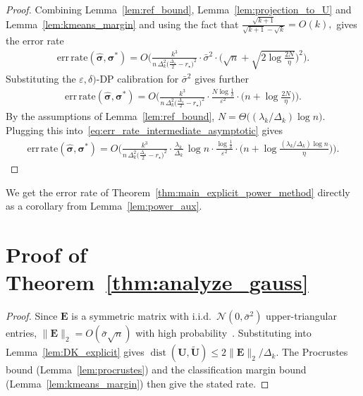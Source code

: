 \documentclass[11pt]{article}
\theoremstyle{plain}
\theoremstyle{definition}
\theoremstyle{remark}
\begin{document}
\begin{proof}

Combining Lemma~\ref{lem:ref_bound},
Lemma~\ref{lem:projection_to_U} and Lemma~\ref{lem:kmeans_margin} and using the fact that 
$
\frac{\sqrt{k+1}}{\sqrt{k+1} - \sqrt{k}} = O(k),
$
gives the error rate
\begin{equation*}
\begin{aligned}
\mathrm{err\,rate}(\hat{\bm{\sigma}},\bm{\sigma}^\ast)
=  O \Bigg(
\frac{k^3}{n\,\Delta_k^2\bigl(\tfrac{\Delta_\star}{2}-r_\star\bigr)^2}
\cdot
\bar\sigma^2
\cdot
\Big(\sqrt{n}+\sqrt{2\log\frac{2N}{\eta}}\Big)^2
\Bigg).
\end{aligned}
\end{equation*}
Substituting the $\varepsilon,\delta)$-DP calibration for $\bar\sigma^2$ gives further
\begin{equation} \label{eq:err_rate_intermediate_asymptotic}
\begin{aligned}
\mathrm{err\,rate}(\hat{\bm{\sigma}},\bm{\sigma}^\ast)
=  O \Bigg(
\frac{k^3}{n\,\Delta_k^2\bigl(\tfrac{\Delta_\star}{2}-r_\star\bigr)^2}
\cdot
\frac{N\log\frac{1}{\delta}}{\varepsilon^2}
\cdot
\Big(n+\log\frac{2N}{\eta}\Big)
\Bigg).
\end{aligned}
\end{equation}
By the assumptions of Lemma~\ref{lem:ref_bound}, $N = \Theta\big((\lambda_k/\Delta_k)\log n\big)$. Plugging this into~\eqref{eq:err_rate_intermediate_asymptotic} gives
\begin{equation*}
\begin{aligned}
\mathrm{err\,rate}(\hat{\bm{\sigma}},\bm{\sigma}^\ast)
=  O \Bigg(
\frac{k^3}{n\,\Delta_k^2\bigl(\tfrac{\Delta_\star}{2}-r_\star\bigr)^2}
\cdot
\frac{\lambda_k}{\Delta_k}\,\log n
\cdot
\frac{\log\frac{1}{\delta}}{\varepsilon^2}
\cdot
\Big(n+\log\frac{(\lambda_k/\Delta_k)\log n}{\eta}\Big)
\Bigg).
\end{aligned}
\end{equation*}
\end{proof}


We get the error rate of Theorem~\ref{thm:main_explicit_power_method} directly as a corollary from Lemma~\ref{lem:power_aux}.



\section{Proof of Theorem~\ref{thm:analyze_gauss}}


\begin{proof}
Since $\mathbf{E}$ is a symmetric matrix with i.i.d.\ $\mathcal{N}(0,\bar{\sigma}^2)$ upper-triangular entries, 
$\|\mathbf{E}\|_2 = O(\bar{\sigma}\sqrt{n})$ with high probability~\citep[Sec.][]{vershynin2018high}. 
Substituting into Lemma~\ref{lem:DK_explicit} gives  $\operatorname{dist}(\mathbf{U}, \widetilde{\mathbf{U}}) 
\le 2\|\mathbf{E}\|_2/\Delta_k$. The Procrustes bound (Lemma~\ref{lem:procrustes}) and the classification margin  bound (Lemma~\ref{lem:kmeans_margin}) then give the  stated rate.
\end{proof}
\end{document}
